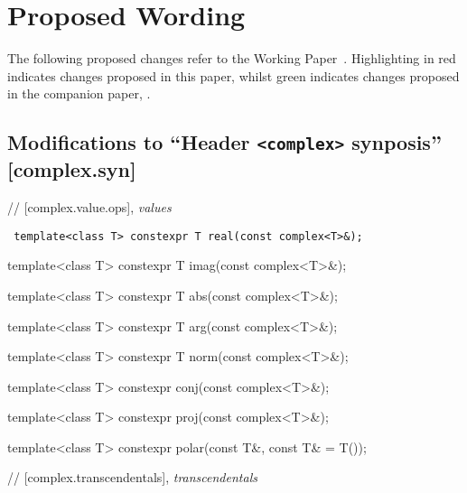 \documentclass[prd,twocolumn,amsmath,amssymb,nofootinbib,eqsecnum]{revtex4-1}
\newcommand{\code}[1]{{\tt #1}}
\newcommand{\header}[1]{{\tt <#1>}}
\newcommand{\highlight}[1]{{\color{red} #1}}
\begin{document}
\newpage

\onecolumngrid

\section{Proposed Wording}

\setlength{\parindent}{0pt}


The following proposed changes refer to the Working Paper~\cite{WorkingPaper}. Highlighting in red indicates changes proposed in this paper, whilst green indicates changes proposed in the companion paper, \cite{Rosten-constexpr}.



\subsection{Modifications to ``Header \header{complex} synposis'' [complex.syn]}

// [complex.value.ops], {\it values }

\vspace{2ex}

\code{
  	template<class T> constexpr T real(const complex<T>\&);
	
  	template<class T> constexpr T imag(const complex<T>\&);

	\vspace{2ex}

	template<class T> \highlight{constexpr} T abs(const complex<T>\&);
 	
	template<class T> \highlight{constexpr} T arg(const complex<T>\&);
	
	template<class T> constexpr T norm(const complex<T>\&);
	
	\vspace{2ex}
	
	template<class T> constexpr conj(const complex<T>\&);
	
	template<class T> \highlight{constexpr} proj(const complex<T>\&);
	
	template<class T> \highlight{constexpr} polar(const T\&, const T\& = T());	

}

\vspace{2ex}

// [complex.transcendentals], {\it transcendentals}
\end{document}
